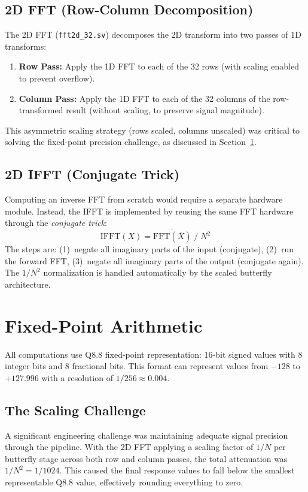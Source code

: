 \documentclass[a4paper,12pt]{report}
\begin{document}
\subsection{2D FFT (Row-Column Decomposition)}
The 2D FFT (\texttt{fft2d\_32.sv}) decomposes the 2D transform into two passes of 1D transforms:
\begin{enumerate}
    \item \textbf{Row Pass:} Apply the 1D FFT to each of the 32 rows (with scaling enabled to prevent overflow).
    \item \textbf{Column Pass:} Apply the 1D FFT to each of the 32 columns of the row-transformed result (without scaling, to preserve signal magnitude).
\end{enumerate}
This asymmetric scaling strategy (rows scaled, columns unscaled) was critical to solving the fixed-point precision challenge, as discussed in Section~\ref{sec_fixedpoint}.

\subsection{2D IFFT (Conjugate Trick)}
Computing an inverse FFT from scratch would require a separate hardware module. Instead, the IFFT is implemented by reusing the same FFT hardware through the \textit{conjugate trick}:
\begin{equation}
    \text{IFFT}(X) = \overline{\text{FFT}(\overline{X})} \;/\; N^2
\end{equation}
The steps are: (1)~negate all imaginary parts of the input (conjugate), (2)~run the forward FFT, (3)~negate all imaginary parts of the output (conjugate again). The $1/N^2$ normalization is handled automatically by the scaled butterfly architecture.

\section{Fixed-Point Arithmetic}
\label{sec_fixedpoint}
All computations use Q8.8 fixed-point representation: 16-bit signed values with 8 integer bits and 8 fractional bits. This format can represent values from $-128$ to $+127.996$ with a resolution of $1/256 \approx 0.004$.

\subsection{The Scaling Challenge}
A significant engineering challenge was maintaining adequate signal precision through the pipeline. With the 2D FFT applying a scaling factor of $1/N$ per butterfly stage across both row and column passes, the total attenuation was $1/N^2 = 1/1024$. This caused the final response values to fall below the smallest representable Q8.8 value, effectively rounding everything to zero.
\end{document}
